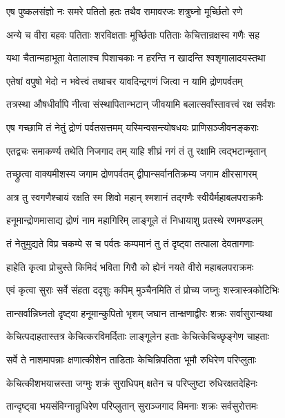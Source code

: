 \twolineshloka
{एष पुष्कलसंज्ञो नः समरे पतितो हतः}
{तथैव रामावरजः शत्रुघ्नो मूर्च्छितो रणे}%

\twolineshloka
{अन्ये च वीरा बहवः पतिताः शरविक्षताः}
{मूर्च्छिताः पतिताः केचित्तान्रक्षस्व गणैः सह}%

\twolineshloka
{यथा चैतान्महाभूता वेतालाश्च पिशाचकाः}
{न हरन्ति न खादन्ति श्वशृगालादयस्तथा}%

\twolineshloka
{एतेषां वपुषो भेदो न भवेत्त्वं तथाचर}
{यावदिन्द्रगणं जित्वा न यामि द्रोणपर्वतम्}%

\twolineshloka
{तत्रस्था औषधीर्वापि नीत्वा संस्थापितान्भटान्}
{जीवयामि बलात्सर्वांस्तावत्त्वं रक्ष सर्वशः}%

\twolineshloka
{एष गच्छामि तं नेतुं द्रोणं पर्वतसत्तमम्}
{यस्मिन्वसन्त्योषधयः प्राणिसञ्जीवनङ्कराः}%

\twolineshloka
{एतद्वचः समाकर्ण्य तथेति निजगाद तम्}
{याहि शीघ्रं नगं तं तु रक्षामि त्वद्भटान्मृतान्}%

\twolineshloka
{तच्छ्रुत्वा वाक्यमीशस्य जगाम द्रोणपर्वतम्}
{द्वीपान्सर्वानतिक्रम्य जगाम क्षीरसागरम्}%

\twolineshloka
{अत्र तु स्वगणैश्चायं रक्षति स्म शिवो महान्}
{श्मशानं तद्गणैः स्वीयैर्महाबलपराक्रमैः}%

\twolineshloka
{हनूमान्द्रोणमासाद्य द्रोणं नाम महागिरिम्}
{लाङ्गूले तं निधायाशु प्रतस्थे रणमण्डलम्}%

\twolineshloka
{तं नेतुमुद्यते विप्र चकम्पे स च पर्वतः}
{कम्पमानं तु तं दृष्ट्वा तत्पाला देवतागणाः}%

\twolineshloka
{हाहेति कृत्वा प्रोचुस्ते किमिदं भविता गिरौ}
{को ह्येनं नयते वीरो महाबलपराक्रमः}%

\twolineshloka
{एवं कृत्वा सुराः सर्वे संहता ददृशुः कपिम्}
{मुञ्चैनमिति तं प्रोच्य जघ्नुः शस्त्रास्त्रकोटिभिः}%

\twolineshloka
{तान्सर्वान्निघ्नतो दृष्ट्वा हनूमान्कुपितो भृशम्}
{जघान तान्क्षणाद्वीरः शक्रः सर्वासुरान्यथा}%

\twolineshloka
{केचित्पदाहतास्तत्र केचित्करविमर्दिताः}
{लाङ्गूलेन हताः केचित्केचिच्छृङ्गेण चाहताः}%

\twolineshloka
{सर्वे ते नाशमापन्नाः क्षणात्कीशेन ताडिताः}
{केचिन्निपतिता भूमौ रुधिरेण परिप्लुताः}%

\twolineshloka
{केचित्कीशभयात्त्रस्ता जग्मुः शक्रं सुराधिपम्}
{क्षतेन च परिप्लुष्टा रुधिरक्षतदेहिनः}%

\twolineshloka
{तान्दृष्ट्वा भयसंविग्नान्रुधिरेण परिप्लुतान्}
{सुराञ्जगाद विमनाः शक्रः सर्वसुरोत्तमः}%

